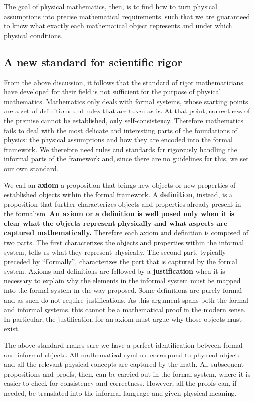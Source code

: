 \documentclass[11pt,letterpaper,fleqn]{memoir} %
\begin{document}
The goal of physical mathematics, then, is to find how to turn physical assumptions into precise mathematical requirements, such that we are guaranteed to know what exactly each mathematical object represents and under which physical conditions.

\subsection{A new standard for scientific rigor}

From the above discussion, it follows that the standard of rigor mathematicians have developed for their field is not sufficient for the purpose of physical mathematics. Mathematics only deals with formal systems, whose starting points are a set of definitions and rules that are taken as is. At that point, correctness of the premise cannot be established, only self-consistency. Therefore mathematics fails to deal with the most delicate and interesting parts of the foundations of physics: the physical assumptions and how they are encoded into the formal framework. We therefore need rules and standards for rigorously handling the informal parts of the framework and, since there are no guidelines for this, we set our own standard.

We call an \textbf{axiom} a proposition that brings new objects or new properties of established objects within the formal framework. A \textbf{definition}, instead, is a proposition that further characterizes objects and properties already present in the formalism. \textbf{An axiom or a definition is well posed only when it is clear what the objects represent physically and what aspects are captured mathematically.} Therefore each axiom and definition is composed of two parts. The first characterizes the objects and properties within the informal system, tells us what they represent physically. The second part, typically preceded by ``Formally'', characterizes the part that is captured by the formal system. Axioms and definitions are followed by a \textbf{justification} when it is necessary to explain why the elements in the informal system must be mapped into the formal system in the way proposed. Some definitions are purely formal and as such do not require justifications. As this argument spans both the formal and informal systems, this cannot be a mathematical proof in the modern sense. In particular, the justification for an axiom must argue why those objects must exist.

The above standard makes sure we have a perfect identification between formal and informal objects. All mathematical symbols correspond to physical objects and all the relevant physical concepts are captured by the math. All subsequent propositions and proofs, then, can be carried out in the formal system, where it is easier to check for consistency and correctness. However, all the proofs can, if needed, be translated into the informal language and given physical meaning.
\end{document}
